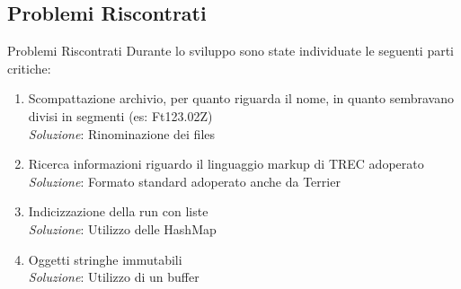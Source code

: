 \subsection{Problemi Riscontrati}
\begin{frame}{Problemi Riscontrati}
	Durante lo sviluppo sono state individuate le seguenti parti critiche:
	\begin{enumerate}
		\item Scompattazione archivio, per quanto riguarda il nome, in quanto sembravano divisi in segmenti (es: Ft123.02Z) 
				\\ \textit{Soluzione}: Rinominazione dei files
		\item Ricerca informazioni riguardo il linguaggio markup di TREC adoperato
				\\ \textit{Soluzione}: Formato standard adoperato anche da Terrier
		\item Indicizzazione della run con liste
				\\ \textit{Soluzione}: Utilizzo delle HashMap
		\item Oggetti stringhe immutabili
				\\ \textit{Soluzione}: Utilizzo di un buffer
	\end{enumerate}
\end{frame}



